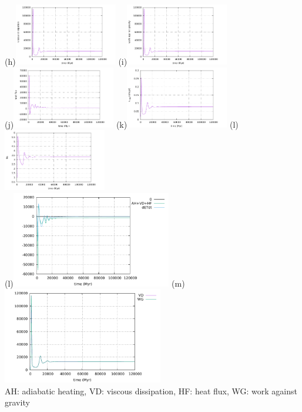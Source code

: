 \begin{center}
(h)\includegraphics[width=4.5cm]{python_codes/fieldstone_compressible2/EBA_105/viscous_dissipation}
(i)\includegraphics[width=4.5cm]{python_codes/fieldstone_compressible2/EBA_105/work_grav}\\
(j)\includegraphics[width=4.5cm]{python_codes/fieldstone_compressible2/EBA_105/heat_flux}
(k)\includegraphics[width=4.5cm]{python_codes/fieldstone_compressible2/EBA_105/vrms}
(l)\includegraphics[width=4.5cm]{python_codes/fieldstone_compressible2/EBA_105/Nu}\\
(l)\includegraphics[width=7cm]{python_codes/fieldstone_compressible2/EBA_105/conservation1}
(m)\includegraphics[width=7cm]{python_codes/fieldstone_compressible2/EBA_105/conservation2}\\
AH: adiabatic heating, VD: viscous dissipation, HF: heat flux, WG: work against gravity
\end{center}


